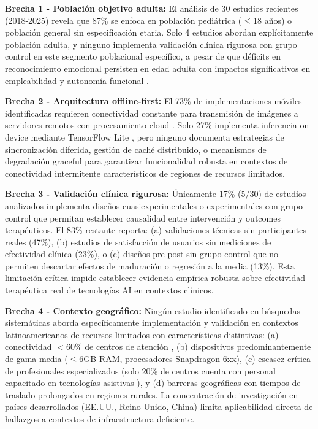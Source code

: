 \documentclass[journal,article,submit,pdftex,moreauthors]{Definitions/mdpi}
\begin{document}
	\textbf{Brecha 1 - Población objetivo adulta:} El análisis de 30 estudios recientes (2018-2025) revela que 87\% se enfoca en población pediátrica ($\leq$18 años) o población general sin especificación etaria. Solo 4 estudios \cite{ref1,ref2,ref7,ref8} abordan explícitamente población adulta, y ninguno implementa validación clínica rigurosa con grupo control en este segmento poblacional específico, a pesar de que déficits en reconocimiento emocional persisten en edad adulta con impactos significativos en empleabilidad y autonomía funcional \cite{ref7,ref13}.
	
	\textbf{Brecha 2 - Arquitectura offline-first:} El 73\% de implementaciones móviles identificadas requieren conectividad constante para transmisión de imágenes a servidores remotos con procesamiento cloud \cite{ref1}. Solo 27\% implementa inferencia on-device mediante TensorFlow Lite \cite{ref2,ref3,ref5,ref6}, pero ninguno documenta estrategias de sincronización diferida, gestión de caché distribuido, o mecanismos de degradación graceful para garantizar funcionalidad robusta en contextos de conectividad intermitente característicos de regiones de recursos limitados.
	
	\textbf{Brecha 3 - Validación clínica rigurosa:} Únicamente 17\% (5/30) de estudios analizados implementa diseños cuasiexperimentales o experimentales con grupo control que permitan establecer causalidad entre intervención y outcomes terapéuticos. El 83\% restante reporta: (a) validaciones técnicas sin participantes reales (47\%), (b) estudios de satisfacción de usuarios sin mediciones de efectividad clínica (23\%), o (c) diseños pre-post sin grupo control que no permiten descartar efectos de maduración o regresión a la media (13\%). Esta limitación crítica impide establecer evidencia empírica robusta sobre efectividad terapéutica real de tecnologías AI en contextos clínicos.
	
	\textbf{Brecha 4 - Contexto geográfico:} Ningún estudio identificado en búsquedas sistemáticas aborda específicamente implementación y validación en contextos latinoamericanos de recursos limitados con características distintivas: (a) conectividad $<$60\% de centros de atención \cite{ref28}, (b) dispositivos predominantemente de gama media ($\leq$6GB RAM, procesadores Snapdragon 6xx), (c) escasez crítica de profesionales especializados (solo 20\% de centros cuenta con personal capacitado en tecnologías asistivas \cite{ref27}), y (d) barreras geográficas con tiempos de traslado prolongados en regiones rurales. La concentración de investigación en países desarrollados (EE.UU., Reino Unido, China) limita aplicabilidad directa de hallazgos a contextos de infraestructura deficiente.
	
\end{document}
